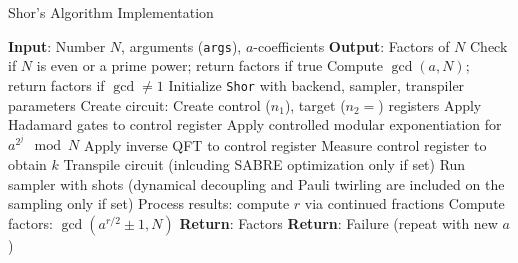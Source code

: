 \documentclass[conference,twoside]{IEEEtran}
\begin{document}
\begin{algorithm}
\caption{Shor's Algorithm Implementation}
\label{alg:shor_factorization}
\begin{algorithmic}
\State \textbf{Input}: Number \( N \), arguments (\texttt{args}), \( a \)-coefficients
\State \textbf{Output}: Factors of \( N \)
\State Check if \( N \) is even or a prime power; return factors if true
\State Compute \( \gcd(a, N) \); return factors if \( \gcd \neq 1 \)
\State Initialize \texttt{Shor} with backend, sampler, transpiler parameters
    \State Create circuit:
    \State \hspace*{1em} Create control (\( n_1 \)), target (\( n_2 = \)) registers
    \State \hspace*{1em} Apply Hadamard gates to control register
    \State \hspace*{1em} Apply controlled modular exponentiation for \hspace*{2.5em} \( a^{2^j} \mod N \)
    \State \hspace*{1em} Apply inverse QFT to control register
    \State \hspace*{1em} Measure control register to obtain \( k \)
    \State Transpile circuit (inlcuding SABRE optimization \hspace*{1em} only if set)
    \State Run sampler with shots (dynamical decoupling \hspace*{1em} and Pauli twirling are included on the sampling \hspace*{1em} only if set)
    \State Process results: compute \( r \) via continued fractions
    \State Compute factors: \( \gcd(a^{r/2} \pm 1, N) \)
        \State \textbf{Return}: Factors
    \EndIf
\EndFor
\State \textbf{Return}: Failure (repeat with new \( a \))
\end{algorithmic}
\end{algorithm}

\end{document}
